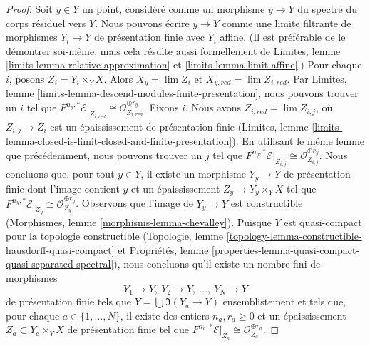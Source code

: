 \begin{proof}
\medskip\noindent
Soit $y \in Y$ un point, considéré comme un morphisme
$y \to Y$ du spectre du corps résiduel vers $Y$.
Nous pouvons écrire $y \to Y$ comme une limite filtrante de morphismes $Y_i \to Y$ de
présentation finie avec $Y_i$ affine. (Il est préférable de le démontrer
soi-même, mais cela résulte aussi formellement de
Limites, lemme \ref{limits-lemma-relative-approximation} et
\ref{limits-lemma-limit-affine}.)
Pour chaque $i$, posons $Z_i = Y_i \times_Y X$. Alors $X_y = \lim Z_i$
et $X_{y, red} = \lim Z_{i, red}$.
Par Limites, lemme \ref{limits-lemma-descend-modules-finite-presentation},
nous pouvons trouver un $i$ tel que
$F^{n_y, *}\mathcal{E}|_{Z_{i, red}} \cong
\mathcal{O}_{Z_{i, red}}^{\oplus r_y}$.
Fixons $i$.
Nous avons $Z_{i, red} = \lim Z_{i, j}$, où $Z_{i, j} \to Z_i$
est un épaississement de présentation finie (Limites, lemme
\ref{limits-lemma-closed-is-limit-closed-and-finite-presentation}).
En utilisant le même lemme que précédemment, nous pouvons trouver un $j$ tel que
$F^{n_y, *}\mathcal{E}|_{Z_{i, j}} \cong \mathcal{O}_{Z_{i, j}}^{\oplus r_y}$.
Nous concluons que, pour tout $y \in Y$, il existe un morphisme
$Y_y \to Y$ de présentation finie dont l'image contient $y$
et un épaississement $Z_y \to Y_y \times_Y X$ tel que
$F^{n_y, *}\mathcal{E}|_{Z_y} \cong \mathcal{O}_{Z_y}^{\oplus r_y}$.
Observons que l'image de $Y_y \to Y$ est constructible
(Morphismes, lemme \ref{morphisms-lemma-chevalley}).
Puisque $Y$ est quasi-compact pour la topologie constructible
(Topologie, lemme \ref{topology-lemma-constructible-hausdorff-quasi-compact} et
Propriétés, lemme \ref{properties-lemma-quasi-compact-quasi-separated-spectral}),
nous concluons qu'il existe un nombre fini de morphismes
$$
Y_1 \to Y,\ Y_2 \to Y,\ \ldots,\ Y_N \to Y
$$
de présentation finie tels que $Y = \bigcup \Im(Y_a \to Y)$
ensemblistement et tels que, pour chaque $a \in \{1, \ldots, N\}$,
il existe des entiers $n_a, r_a \geq 0$ et un épaississement
$Z_a \subset Y_a \times_Y X$ de présentation finie tel que
$F^{n_a, *}\mathcal{E}|_{Z_a} \cong \mathcal{O}_{Z_a}^{\oplus r_a}$.


\end{proof}
